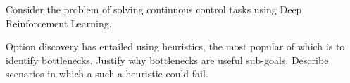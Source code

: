 \documentclass[solution,addpoints,12pt]{exam}
\begin{document}
\begin{questions}
\begin{solution}
\end{solution}

\question[3] Consider the problem of solving continuous control tasks using Deep Reinforcement Learning.



\question[3] Option discovery has entailed using heuristics, the most popular of which is to identify bottlenecks. Justify why bottlenecks are useful sub-goals. Describe scenarios in which a such a heuristic could fail.
\begin{solution}

\end{solution}

\end{questions}
\end{document}
